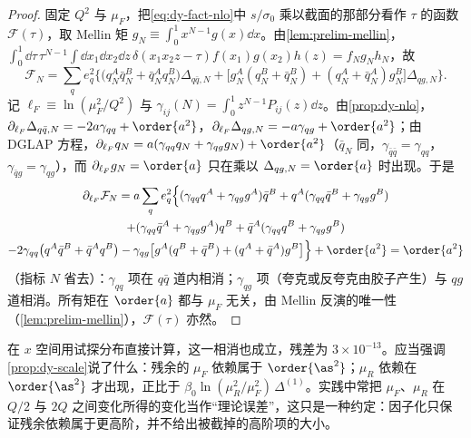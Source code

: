 \begin{proof}
固定 $Q^2$ 与 $\mu_F$，把\cref{eq:dy-fact-nlo}中 $s/\sigma_0$ 乘以截面的那部分看作 $\tau$ 的函数 $\mathcal F(\tau)$，取 Mellin 矩 $g_N\equiv\int_0^1x^{N-1}g(x)\dd x$。由\cref{lem:prelim-mellin}，$\int_0^1\dd\tau\,\tau^{N-1}\int\dd x_1\dd x_2\dd z\,\delta(x_1x_2z-\tau)f(x_1)g(x_2)h(z)=f_Ng_Nh_N$，故
\[
\mathcal F_N=\sum_qe_q^2\Big\{\big(q_N^A\bar q_N^B+\bar q_N^Aq_N^B\big)\Delta_{q\bar q,N}+\big[g_N^A(q_N^B+\bar q_N^B)+(q_N^A+\bar q_N^A)g_N^B\big]\Delta_{qg,N}\Big\}.
\]
记 $\ell_F\equiv\ln(\mu_F^2/Q^2)$ 与 $\gamma_{ij}(N)=\int_0^1z^{N-1}P_{ij}(z)\dd z$。由\cref{prop:dy-nlo}，$\partial_{\ell_F}\Delta_{q\bar q,N}=-2a\gamma_{qq}+\order{a^2}$，$\partial_{\ell_F}\Delta_{qg,N}=-a\gamma_{qg}+\order{a^2}$；由 DGLAP 方程，$\partial_{\ell_F}q_N=a(\gamma_{qq}q_N+\gamma_{qg}g_N)+\order{a^2}$（$\bar q_N$ 同，$\gamma_{\bar q\bar q}=\gamma_{qq}$，$\gamma_{\bar qg}=\gamma_{qg}$），而 $\partial_{\ell_F}g_N=\order{a}$ 只在乘以 $\Delta_{qg,N}=\order{a}$ 时出现。于是
\begin{multline*}
\partial_{\ell_F}\mathcal F_N=a\sum_qe_q^2\Big\{(\gamma_{qq}q^A+\gamma_{qg}g^A)\bar q^B+q^A(\gamma_{qq}\bar q^B+\gamma_{qg}g^B)\\
+(\gamma_{qq}\bar q^A+\gamma_{qg}g^A)q^B+\bar q^A(\gamma_{qq}q^B+\gamma_{qg}g^B)\\
-2\gamma_{qq}\big(q^A\bar q^B+\bar q^Aq^B\big)-\gamma_{qg}\big[g^A(q^B+\bar q^B)+(q^A+\bar q^A)g^B\big]\Big\}+\order{a^2}=\order{a^2}
\end{multline*}
（指标 $N$ 省去）：$\gamma_{qq}$ 项在 $q\bar q$ 道内相消；$\gamma_{qg}$ 项（夸克或反夸克由胶子产生）与 $qg$ 道相消。所有矩在 $\order{a}$ 都与 $\mu_F$ 无关，由 Mellin 反演的唯一性（\cref{lem:prelim-mellin}），$\mathcal F(\tau)$ 亦然。
\end{proof}

在 $x$ 空间用试探分布直接计算，这一相消也成立，残差为 $3\times10^{-13}$。应当强调\cref{prop:dy-scale}说了什么：残余的 $\mu_F$ 依赖属于 $\order{\as^2}$；$\mu_R$ 依赖在 $\order{\as^2}$ 才出现，正比于 $\beta_0\ln(\mu_R^2/\mu_F^2)\,\Delta^{(1)}$。实践中常把 $\mu_F$、$\mu_R$ 在 $Q/2$ 与 $2Q$ 之间变化所得的变化当作“理论误差”，这只是一种约定：因子化只保证残余依赖属于更高阶，并不给出被截掉的高阶项的大小。

